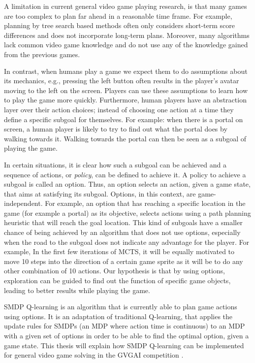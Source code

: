 A limitation in current general video game playing research, is that many games
are too complex to plan far ahead in a reasonable time frame. For example,
planning by tree search based methods often only considers short-term score
differences and does not incorporate long-term plans. Moreover, many algorithms
lack common video game knowledge and do not use any of the knowledge gained from
the previous games.

In contrast, when humans play a game we expect them to do assumptions about
its mechanics, e.g., pressing the left button often results in the player's
avatar moving to the left on the screen. Players can use these assumptions to
learn how to play the game more quickly. Furthermore, human players have an
abstraction layer over their action choices; instead of choosing one action at a
time they define a specific subgoal for themselves.  For example: when there is
a portal on screen, a human player is likely to try to find out what the portal
does by walking towards it. Walking towards the portal can then be seen as a
subgoal of playing the game. 


In certain situations, it is clear how such a subgoal can be achieved and a
sequence of actions, or \emph{policy}, can be defined to achieve it. A policy to
achieve a subgoal is called an option. Thus, an option selects an action, given
a game state, that aims at satisfying its subgoal. Options, in this context, are
game-independent. For example, an option that has reaching a specific location
in the game (for example a portal) as its objective, selects actions using a
path planning heuristic that will reach the goal location. This kind of subgoals
have a smaller chance of being achieved by an algorithm that does not use
options, especially when the road to the subgoal does not indicate any advantage
for the player. For example, In the first few iterations of MCTS, it will be
equally motivated to move 10 steps into the direction of a certain game sprite
as it will be to do any other combination of 10 actions. Our hypothesis is that
by using options, exploration can be guided to find out the function of
specific game objects, leading to better results while playing the game.

SMDP Q-learning is an algorithm that is currently able to plan game actions
using options. It is an adaptation of traditional Q-learning, that applies the
update rules for SMDPs (an MDP where action time is continuous) to an MDP with a
given set of options in order to be able to find the optimal option, given a
game state. This thesis will explain how SMDP Q-learning can be implemented for
general video game solving in the GVGAI competition \cite{perez2014}. 

